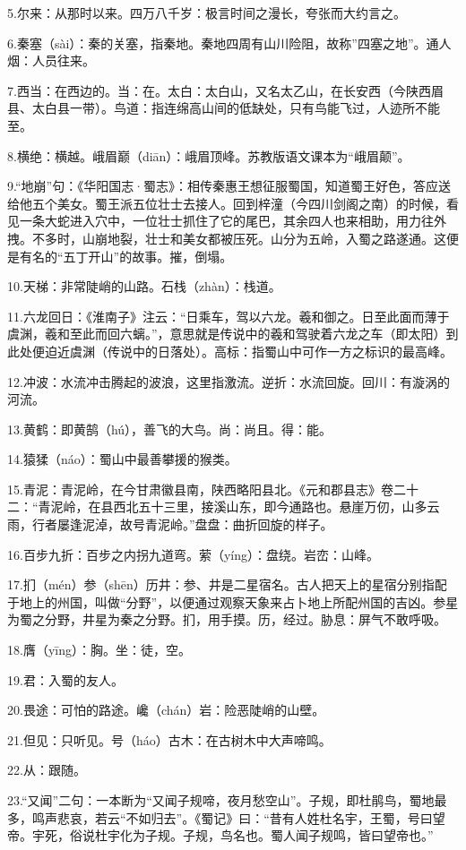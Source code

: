\documentclass[letterpaper,12pt,english]{sphinxmanual}
\begin{document}
5.尔来：从那时以来。四万八千岁：极言时间之漫长，夸张而大约言之。

6.秦塞（sài）：秦的关塞，指秦地。秦地四周有山川险阻，故称”四塞之地”。通人烟：人员往来。

7.西当：在西边的。当：在。太白：太白山，又名太乙山，在长安西（今陕西眉县、太白县一带）。鸟道：指连绵高山间的低缺处，只有鸟能飞过，人迹所不能至。

8.横绝：横越。峨眉巅（diān）：峨眉顶峰。苏教版语文课本为“峨眉颠”。

9.“地崩”句：《华阳国志·蜀志》：相传秦惠王想征服蜀国，知道蜀王好色，答应送给他五个美女。蜀王派五位壮士去接人。回到梓潼（今四川剑阁之南）的时候，看见一条大蛇进入穴中，一位壮士抓住了它的尾巴，其余四人也来相助，用力往外拽。不多时，山崩地裂，壮士和美女都被压死。山分为五岭，入蜀之路遂通。这便是有名的“五丁开山”的故事。摧，倒塌。

10.天梯：非常陡峭的山路。石栈（zhàn）：栈道。

11.六龙回日：《淮南子》注云：“日乘车，驾以六龙。羲和御之。日至此面而薄于虞渊，羲和至此而回六螭。”，意思就是传说中的羲和驾驶着六龙之车（即太阳）到此处便迫近虞渊（传说中的日落处）。高标：指蜀山中可作一方之标识的最高峰。

12.冲波：水流冲击腾起的波浪，这里指激流。逆折：水流回旋。回川：有漩涡的河流。

13.黄鹤：即黄鹄（hú），善飞的大鸟。尚：尚且。得：能。

14.猿猱（náo）：蜀山中最善攀援的猴类。

15.青泥：青泥岭，在今甘肃徽县南，陕西略阳县北。《元和郡县志》卷二十二：“青泥岭，在县西北五十三里，接溪山东，即今通路也。悬崖万仞，山多云雨，行者屡逢泥淖，故号青泥岭。”盘盘：曲折回旋的样子。

16.百步九折：百步之内拐九道弯。萦（yíng）：盘绕。岩峦：山峰。

17.扪（mén）参（shēn）历井：参、井是二星宿名。古人把天上的星宿分别指配于地上的州国，叫做“分野”，以便通过观察天象来占卜地上所配州国的吉凶。参星为蜀之分野，井星为秦之分野。扪，用手摸。历，经过。胁息：屏气不敢呼吸。

18.膺（yīng）：胸。坐：徒，空。

19.君：入蜀的友人。

20.畏途：可怕的路途。巉（chán）岩：险恶陡峭的山壁。

21.但见：只听见。号（háo）古木：在古树木中大声啼鸣。

22.从：跟随。

23.“又闻”二句：一本断为“又闻子规啼，夜月愁空山”。子规，即杜鹃鸟，蜀地最多，鸣声悲哀，若云“不如归去”。《蜀记》曰：“昔有人姓杜名宇，王蜀，号曰望帝。宇死，俗说杜宇化为子规。子规，鸟名也。蜀人闻子规鸣，皆曰望帝也。”
\end{document}
